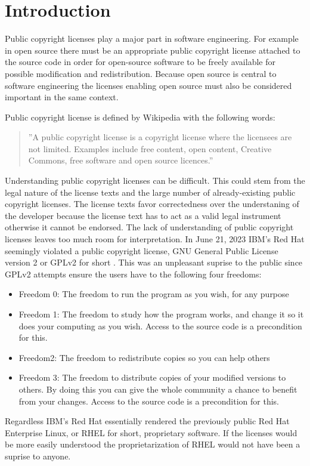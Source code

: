 \chapter{Introduction\label{intro}}

Public copyright licenses play a major part in software engineering. For example in open source there must be an appropriate public copyright license attached to the source code in order for open-source software to be freely available for possible modification and redistribution. Because open source is central to software engineering the licenses enabling open source must also be considered important in the same context.

Public copyright license is defined by Wikipedia with the following words:
\begin{quote}
	''A public copyright license is a copyright license where the licensees are not limited. Examples include free content, open content, Creative Commons, free software and open source licences.''
\end{quote} \citep{wiki:publiclicenses}

Understanding public copyright licenses can be difficult. This could stem from the legal nature of the license texts and the large number of already-existing public copyright licenses. The license texts favor correctedness over the understaning of the developer because the license text has to act as a valid legal instrument otherwise it cannot be endorsed. The lack of understanding of public copyright licenses leaves too much room for interpretation. In June 21, 2023 IBM's Red Hat seemingly violated a public copyright license, GNU General Public License version 2 or GPLv2 for short \citep{sfc:rhel} \citep{ibm:rhel}. This was an unpleasant suprise to the public since GPLv2 attempts ensure the users have to the following four freedoms:
\begin{itemize}
	\item Freedom 0: The freedom to run the program as you wish, for any purpose
	\item Freedom 1:	The freedom to study how the program works, and change it so it does your computing as you wish. Access to the source code is a precondition for this.
	\item Freedom2: The freedom to redistribute copies so you can help others
	\item Freedom 3:	The freedom to distribute copies of your modified versions to others. By doing this you can give the whole community a chance to benefit from your changes. Access to the source code is a precondition for this.
\end{itemize}
\citep{fsf:free}
Regardless IBM's Red Hat essentially rendered the previously public Red Hat Enterprise Linux, or RHEL for short, proprietary software. If the licenses would be more easily understood the proprietarization of RHEL would not have been a suprise to anyone.

